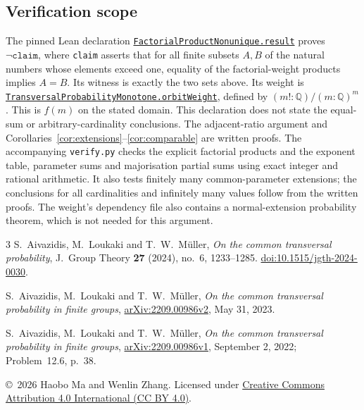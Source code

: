 \documentclass[11pt]{article}
\begin{document}
\subsection*{Verification scope}
The pinned Lean declaration
\href{https://github.com/the-omega-institute/trureturing/blob/736015507f370926a4b39c6a5ca4f090fc50cae3/D5/S3/FiniteGroups/FactorialProductNonunique.lean}{\texttt{FactorialProductNonunique.result}}
proves $\neg\texttt{claim}$, where \texttt{claim} asserts that for all finite
subsets $A,B$ of the natural numbers whose elements exceed one, equality of
the factorial-weight products implies $A=B$. Its witness is exactly the
two sets above. Its weight is
\href{https://github.com/the-omega-institute/trureturing/blob/736015507f370926a4b39c6a5ca4f090fc50cae3/D5/S3/FiniteGroups/TransversalProbabilityMonotone.lean}{\texttt{TransversalProbabilityMonotone.orbitWeight}},
defined by $(m!:\mathbb Q)/(m:\mathbb Q)^m$. This is $f(m)$ on the
stated domain. This declaration does not state the equal-sum or
arbitrary-cardinality conclusions. The adjacent-ratio argument and
Corollaries~\ref{cor:extensions}--\ref{cor:comparable} are written proofs. The accompanying
\texttt{verify.py} checks the explicit factorial products and the exponent
table, parameter sums and majorisation partial sums using exact integer and
rational arithmetic. It also tests finitely many common-parameter extensions;
the conclusions for all cardinalities and infinitely many values follow
from the written proofs. The weight's dependency file also contains a
normal-extension probability theorem, which is not needed for this argument.

\begin{thebibliography}{3}
S.~Aivazidis, M.~Loukaki and T.~W.~M\"uller,
\emph{On the common transversal probability},
J.~Group Theory \textbf{27} (2024), no.~6, 1233--1285.
\href{https://doi.org/10.1515/jgth-2024-0030}{doi:10.1515/jgth-2024-0030}.

S.~Aivazidis, M.~Loukaki and T.~W.~M\"uller,
\emph{On the common transversal probability in finite groups},
\href{https://arxiv.org/abs/2209.00986v2}{arXiv:2209.00986v2},
May 31, 2023.

S.~Aivazidis, M.~Loukaki and T.~W.~M\"uller,
\emph{On the common transversal probability in finite groups},
\href{https://arxiv.org/abs/2209.00986v1}{arXiv:2209.00986v1},
September 2, 2022; Problem~12.6, p.~38.
\end{thebibliography}

\bigskip
\noindent\footnotesize
\copyright\ 2026 Haobo Ma and Wenlin Zhang.
Licensed under \href{https://creativecommons.org/licenses/by/4.0/}{Creative
Commons Attribution 4.0 International (CC BY 4.0)}.
\end{document}
